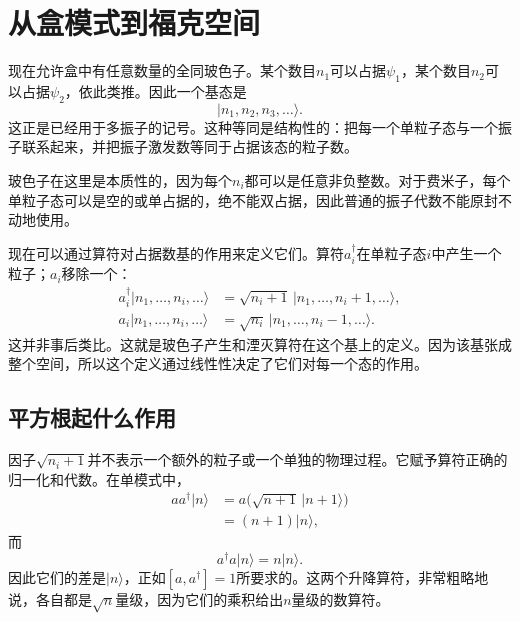 \begin{classroomqa}
\end{classroomqa}

\section{从盒模式到福克空间}

现在允许盒中有任意数量的全同玻色子。某个数目\(n_1\)可以占据\(\psi_1\)，某个数目\(n_2\)可以占据\(\psi_2\)，依此类推。因此一个基态是
\begin{equation}
|n_1,n_2,n_3,\ldots\rangle.
\end{equation}
这正是已经用于多振子的记号。这种等同是结构性的：把每一个单粒子态与一个振子联系起来，并把振子激发数等同于占据该态的粒子数。

玻色子在这里是本质性的，因为每个\(n_i\)都可以是任意非负整数。对于费米子，每个单粒子态可以是空的或单占据的，绝不能双占据，因此普通的振子代数不能原封不动地使用。

现在可以通过算符对占据数基的作用来定义它们。算符\(a_i^\dagger\)在单粒子态\(i\)中产生一个粒子；\(a_i\)移除一个：
\begin{align}
a_i^\dagger|n_1,\ldots,n_i,\ldots\rangle
&=\sqrt{n_i+1}\,|n_1,\ldots,n_i+1,\ldots\rangle, \\
a_i|n_1,\ldots,n_i,\ldots\rangle
&=\sqrt{n_i}\,|n_1,\ldots,n_i-1,\ldots\rangle.
\end{align}
这并非事后类比。这就是玻色子产生和湮灭算符在这个基上的定义。因为该基张成整个空间，所以这个定义通过线性性决定了它们对每一个态的作用。

\begin{classroomqa}
\end{classroomqa}

\subsection{平方根起什么作用}

因子\(\sqrt{n_i+1}\)并不表示一个额外的粒子或一个单独的物理过程。它赋予算符正确的归一化和代数。在单模式中，
\begin{align}
a a^\dagger|n\rangle
&=a\bigl(\sqrt{n+1}\,|n+1\rangle\bigr) \\
&=(n+1)|n\rangle,
\end{align}
而
\begin{equation}
a^\dagger a|n\rangle=n|n\rangle.
\end{equation}
因此它们的差是\(|n\rangle\)，正如\([a,a^\dagger]=1\)所要求的。这两个升降算符，非常粗略地说，各自都是\(\sqrt n\)量级，因为它们的乘积给出\(n\)量级的数算符。

